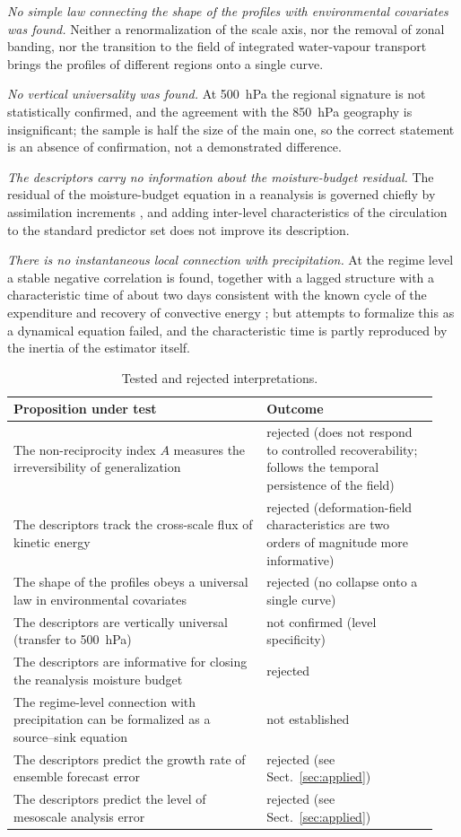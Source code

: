 \documentclass[11pt,a4paper]{article}
\begin{document}
\emph{No simple law connecting the shape of the profiles with environmental covariates was found.} Neither a renormalization of the scale axis, nor the removal of zonal banding, nor the transition to the field of integrated water-vapour transport brings the profiles of different regions onto a single curve.

\emph{No vertical universality was found.} At 500~hPa the regional signature is not statistically confirmed, and the agreement with the 850~hPa geography is insignificant; the sample is half the size of the main one, so the correct statement is an absence of confirmation, not a demonstrated difference.

\emph{The descriptors carry no information about the moisture-budget residual.} The residual of the moisture-budget equation in a reanalysis is governed chiefly by assimilation increments \cite{Trenberth1991,Mayer2021}, and adding inter-level characteristics of the circulation to the standard predictor set does not improve its description.

\emph{There is no instantaneous local connection with precipitation.} At the regime level a stable negative correlation is found, together with a lagged structure with a characteristic time of about two days consistent with the known cycle of the expenditure and recovery of convective energy \cite{Masunaga2012,PetersNeelin2006}; but attempts to formalize this as a dynamical equation failed, and the characteristic time is partly reproduced by the inertia of the estimator itself.

\begin{table}[t]
\centering
\caption{Tested and rejected interpretations.}
\label{tab:negative}
\small
\begin{tabular}{@{}p{0.56\linewidth}p{0.38\linewidth}@{}}
\toprule
Proposition under test & Outcome\\
\midrule
The non-reciprocity index $A$ measures the irreversibility of generalization & rejected (does not respond to controlled recoverability; follows the temporal persistence of the field)\\
The descriptors track the cross-scale flux of kinetic energy & rejected (deformation-field characteristics are two orders of magnitude more informative)\\
The shape of the profiles obeys a universal law in environmental covariates & rejected (no collapse onto a single curve)\\
The descriptors are vertically universal (transfer to 500~hPa) & not confirmed (level specificity)\\
The descriptors are informative for closing the reanalysis moisture budget & rejected\\
The regime-level connection with precipitation can be formalized as a source--sink equation & not established\\
The descriptors predict the growth rate of ensemble forecast error & rejected (see Sect.~\ref{sec:applied})\\
The descriptors predict the level of mesoscale analysis error & rejected (see Sect.~\ref{sec:applied})\\
\bottomrule
\end{tabular}
\end{table}
\end{document}
